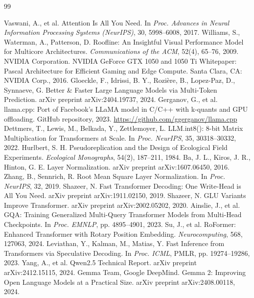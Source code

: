 \documentclass[10pt,a4paper,twocolumn]{article}
\begin{document}
\begin{thebibliography}{99}
\begin{singlespace}
\setlength{\itemsep}{0.25em}
 Vaswani, A., et al. Attention Is All You Need. In \emph{Proc. Advances in Neural Information Processing Systems (NeurIPS)}, 30, 5998--6008, 2017.
 Williams, S., Waterman, A., Patterson, D. Roofline: An Insightful Visual Performance Model for Multicore Architectures. \emph{Communications of the ACM}, 52(4), 65--76, 2009.
 NVIDIA Corporation. NVIDIA GeForce GTX 1050 and 1050 Ti Whitepaper: Pascal Architecture for Efficient Gaming and Edge Compute. Santa Clara, CA: NVIDIA Corp., 2016.
 Gloeckle, F., Idrissi, B. Y., Rozi\`ere, B., Lopez-Paz, D., Synnaeve, G. Better \& Faster Large Language Models via Multi-Token Prediction. arXiv preprint arXiv:2404.19737, 2024.
 Gerganov, G., et al. llama.cpp: Port of Facebook's LLaMA model in C/C++ with k-quants and GPU offloading. GitHub repository, 2023. \url{https://github.com/ggerganov/llama.cpp}
 Dettmers, T., Lewis, M., Belkada, Y., Zettlemoyer, L. LLM.int8(): 8-bit Matrix Multiplication for Transformers at Scale. In \emph{Proc. NeurIPS}, 35, 30318--30332, 2022.
 Hurlbert, S. H. Pseudoreplication and the Design of Ecological Field Experiments. \emph{Ecological Monographs}, 54(2), 187--211, 1984.
 Ba, J. L., Kiros, J. R., Hinton, G. E. Layer Normalization. arXiv preprint arXiv:1607.06450, 2016.
 Zhang, B., Sennrich, R. Root Mean Square Layer Normalization. In \emph{Proc. NeurIPS}, 32, 2019.
 Shazeer, N. Fast Transformer Decoding: One Write-Head is All You Need. arXiv preprint arXiv:1911.02150, 2019.
 Shazeer, N. GLU Variants Improve Transformer. arXiv preprint arXiv:2002.05202, 2020.
 Ainslie, J., et al. GQA: Training Generalized Multi-Query Transformer Models from Multi-Head Checkpoints. In \emph{Proc. EMNLP}, pp. 4895--4901, 2023.
 Su, J., et al. RoFormer: Enhanced Transformer with Rotary Position Embedding. \emph{Neurocomputing}, 568, 127063, 2024.
 Leviathan, Y., Kalman, M., Matias, Y. Fast Inference from Transformers via Speculative Decoding. In \emph{Proc. ICML}, PMLR, pp. 19274--19286, 2023.
 Yang, A., et al. Qwen2.5 Technical Report. arXiv preprint arXiv:2412.15115, 2024.
 Gemma Team, Google DeepMind. Gemma 2: Improving Open Language Models at a Practical Size. arXiv preprint arXiv:2408.00118, 2024.

\end{singlespace}
\end{thebibliography}
\end{document}
